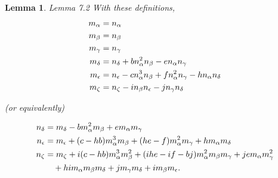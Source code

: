 \documentclass{memo-l}
\newtheorem{lemma}[theorem]{Lemma}
\theoremstyle{definition}
\theoremstyle{remark}
\numberwithin{section}{chapter}
\numberwithin{equation}{chapter}
\begin{document}
\begin{lemma}{Lemma 7.2}   With these definitions,
$$
\aligned
m_{{\alpha}} &= n_{{\alpha}} \\
m_{{\beta}} &= n_{{\beta}} \\
m_{{\gamma}} &= n_{{\gamma}}\\
m_{{\delta}} &= n_{{\delta}}+bn_{{\alpha}}^{2}n_{{\beta}}-en_{{\alpha}}
n_{{\gamma}} \\
m_{{\epsilon}} &= n_{{\epsilon}}-cn_{{\alpha}}^{3}n_{{\beta}} +
fn_{{\alpha}}^{2}n_{{\gamma}}-hn_{{\alpha}}n_{{\delta}} \\
m_{{\zeta}} &= n_{{\zeta}}-in_{{\beta}}n_{{\epsilon}}-jn_{{\gamma}}
n_{{\delta}}
\endaligned
$$

\noindent
(or equivalently)

$$
\aligned
n_{{\delta}} &= m_{{\delta}}-bm_{{\alpha}}^{2}m_{{\beta}}+em_{{\alpha}}
m_{{\gamma}} \\
n_{{\epsilon}} &= m_{{\epsilon}}+(c-hb)m_{{\alpha}}^{3}m_{{\beta}}+(he-f)
m_{{\alpha}}^{2}m_{{\gamma}}+hm_{{\alpha}}m_{{\delta}} \\
n_{{\zeta}} &= m_{{\zeta}}+i(c-hb)m_{{\alpha}}^{3}m_{{\beta}}^{2} +
(ihe-if-bj)m_{{\alpha}}^{2}m_{{\beta}}m_{{\gamma}}+jem_{{\alpha}}
m_{{\gamma}}^{2} \\
& \quad +him_{{\alpha}}m_{{\beta}}m_{{\delta}}+jm_{{\gamma}}
m_{{\delta}}+im_{{\beta}}m_{{\epsilon}} .
\endaligned
$$
\end{lemma}
\end{document}
